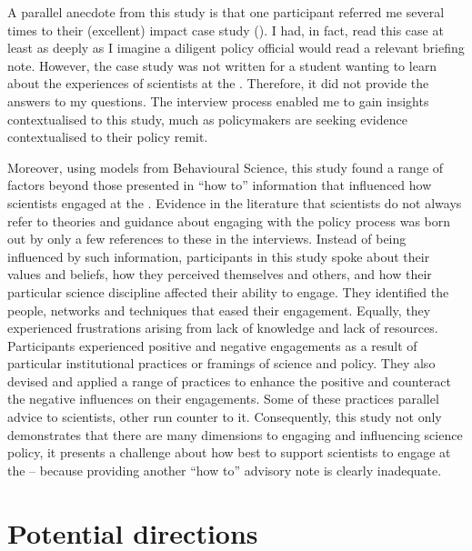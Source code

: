 A parallel anecdote from this study is that one participant referred me several times to their (excellent) impact case study (). I had, in fact, read this case at least as deeply as I imagine a diligent policy official would read a relevant briefing note. However, the case study was not written for a student wanting to learn about the experiences of scientists at the \CAN{} \SPI. Therefore, it did not provide the answers to my questions. The interview process enabled me to gain insights contextualised to this study, much as policymakers are seeking evidence contextualised to their policy remit. 

Moreover, using models from Behavioural Science, this study found a range of factors beyond those presented in ``how to'' information that influenced how scientists engaged at the \SPI. Evidence in the literature that scientists do not always refer to theories and guidance about engaging with the policy process was born out by only a few references to these in the interviews. Instead of being influenced by such information, participants in this study spoke about their values and beliefs, how they perceived themselves and others, and how their particular science discipline affected their ability to engage. They identified the people, networks and techniques that eased their engagement. Equally, they experienced frustrations arising from lack of knowledge and lack of resources. Participants experienced positive and negative engagements as a result of particular institutional practices or framings of \CAN{} science and policy. They also devised and applied a range of practices to enhance the positive and counteract the negative influences on their engagements. Some of these practices parallel advice to scientists, other run counter to it. Consequently, this study not only demonstrates that there are many dimensions to engaging and influencing \CAN{} science policy, it presents a challenge about how best to support scientists to engage at the \SPI{} -- because providing another ``how to'' advisory note is clearly inadequate.



\section{Potential directions}\label{sec:disdirections}

